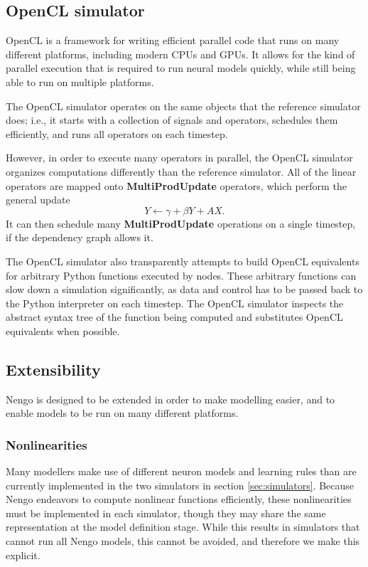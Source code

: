 \documentclass{frontiersSCNS}
\begin{document}
\subsection{OpenCL simulator}

OpenCL is a framework for writing
efficient parallel code that runs
on many different platforms,
including modern CPUs and GPUs.
It allows for the kind of parallel execution
that is required to run neural models quickly,
while still being able to run
on multiple platforms.

The OpenCL simulator operates on
the same objects that the reference simulator does;
i.e., it starts with a collection
of signals and operators,
schedules them efficiently,
and runs all operators on each timestep.

However, in order to execute
many operators in parallel,
the OpenCL simulator
organizes computations
differently than the reference simulator.
All of the linear operators are mapped
onto \textbf{MultiProdUpdate} operators,
which perform the general update
$$Y \leftarrow \gamma + \beta Y + AX.$$
It can then schedule many
\textbf{MultiProdUpdate} operations
on a single timestep,
if the dependency graph allows it.

The OpenCL simulator also transparently
attempts to build OpenCL equivalents
for arbitrary Python functions
executed by nodes.
These arbitrary functions
can slow down a simulation significantly,
as data and control has to be passed back
to the Python interpreter
on each timestep.
The OpenCL simulator inspects
the abstract syntax tree
of the function being computed
and substitutes OpenCL equivalents when possible.

\subsection{Extensibility}

Nengo is designed to be extended
in order to make modelling easier,
and to enable models to be run
on many different platforms.

\subsubsection{Nonlinearities}

Many modellers make use of
different neuron models and
learning rules than are
currently implemented
in the two simulators
in section \ref{sec:simulators}.
Because Nengo endeavors
to compute nonlinear functions efficiently,
these nonlinearities
must be implemented in each simulator,
though they may share the same representation
at the model definition stage.
While this results in simulators
that cannot run all Nengo models,
this cannot be avoided,
and therefore we make this explicit.
\end{document}
